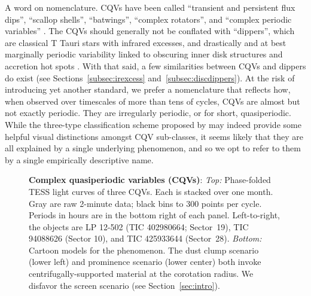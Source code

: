 \documentclass[11pt,twocolumn,tighten]{aastex63}
\begin{document}
A word on nomenclature.  CQVs have been called ``transient and
persistent flux dips'', ``scallop shells'', ``batwings'',
\citep{2017AJ....153..152S} ``complex rotators'',
\citep{2019ApJ...876..127Z,2022AJ....163..144G,2023ApJ...945..114P}
and ``complex periodic variables'' \citep{2023MNRAS.518.2921K}.  
The CQVs should generally not be conflated with ``dippers'', which are classical T
Tauri stars with infrared excesses, and drastically and 
at best marginally periodic variability linked
to obscuring inner disk structures and accretion hot spots
\citep{2014AJ....147...82C,2021ApJ...908...16R}.  
With that said, a few similarities between CQVs and dippers do exist
(see Sections~\ref{subsec:irexcess} and~\ref{subsec:discdippers}).
At the risk of
introducing yet another standard, we prefer a nomenclature that
reflects how, when observed over timescales of more than tens of
cycles, CQVs are almost but not exactly periodic.  They are
irregularly periodic, or for short, quasiperiodic.  While the
three-type classification scheme proposed by
\citet{2017AJ....153..152S} may indeed provide some helpful visual
distinctions amongst CQV sub-classes, it seems likely that they are
all explained by a single underlying phenomenon, and so we opt to
refer to them by a single empirically descriptive name.


\begin{figure*}[!t]
	\begin{center}
		
		\vspace{-0.6cm}
	\end{center}
		\vspace{-0.3cm}
	\caption{
		{\bf Complex quasiperiodic variables (CQVs)}:
		{\it Top:} Phase-folded TESS light curves of three CQVs.  Each is
		stacked over one month.  Gray are raw 2-minute data; black bins to
		300 points per cycle.  Periods in hours are in the bottom right of
		each panel.  Left-to-right, the objects are LP 12-502
		(TIC 402980664; Sector~19), TIC 94088626 (Sector 10), and TIC
		425933644 (Sector~28).
		{\it Bottom:} Cartoon models for the phenomenon.  The dust clump
		scenario
		(lower left) and prominence scenario (lower center) both invoke centrifugally-supported material at the
		corotation radius.
		We disfavor the screen scenario (see Section~\ref{sec:intro}).
	}
	\label{fig:f1}
\end{figure*}
\end{document}
